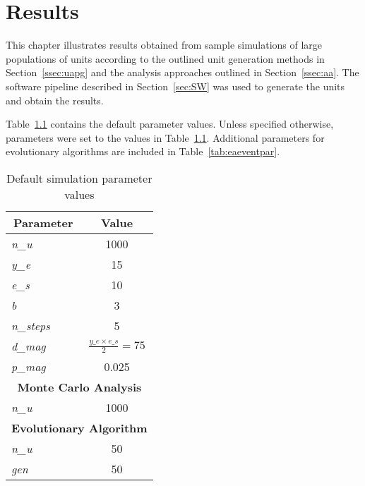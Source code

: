 \chapter{Results}
\label{chp:R}


This chapter illustrates results obtained from sample simulations of large populations of units according to the outlined unit generation methods in Section~\ref{ssec:uapg} and the analysis approaches outlined in Section~\ref{ssec:aa}. The software pipeline described in Section~\ref{sec:SW} was used to generate the units and obtain the results.

Table~\ref{tab:defpar} contains the default parameter values. Unless specified otherwise, parameters were set to the values in Table~\ref{tab:defpar}. Additional parameters for evolutionary algorithms are included in Table~\ref{tab:eaeventpar}.

\begin{table}[H]
\centering
\caption{Default simulation parameter values}
\label{tab:defpar}
\begin{tabular}{@{}lc@{}}
\toprule
\multicolumn{1}{c}{\textbf{Parameter}} & \textbf{Value}                 \\ \midrule
\textit{n\_u}                          & 1000                           \\
\textit{y\_e}                          & 15                             \\
\textit{e\_s}                          & 10                             \\
\textit{b}                             & 3                              \\
\textit{n\_steps}                      & 5                              \\
\textit{d\_mag}                        & $\frac{y\_e\times e\_s}{2}=75$ \\
\textit{p\_mag}                        & 0.025                          \\ \midrule
\multicolumn{2}{c}{\textbf{Monte Carlo Analysis}}                       \\ \midrule
\textit{n\_u}                          & 1000                           \\ \midrule
\multicolumn{2}{c}{\textbf{Evolutionary Algorithm}}                     \\ \midrule
\textit{n\_u}                          & 50                             \\
\textit{gen}                           & 50                             \\ \bottomrule
\end{tabular}
\end{table}

